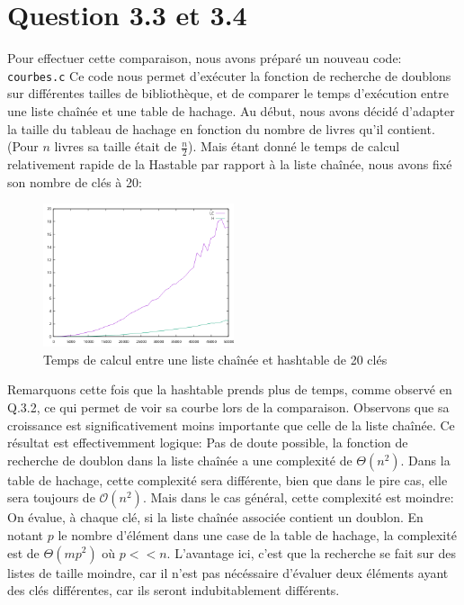 \documentclass{article}
\begin{document}
    \newpage
    \section{Question 3.3 et 3.4}
    
    Pour effectuer cette comparaison, nous avons préparé un nouveau code: 
    \texttt{courbes.c}
    \newline
    Ce code nous permet d'exécuter la fonction de recherche de doublons sur 
    différentes tailles de bibliothèque, et de comparer le temps d'exécution
    entre une liste chaînée et une table de hachage.
    \newline
    Au début, nous avons décidé d'adapter la taille du tableau de hachage en
    fonction du nombre de livres qu'il contient. (Pour $n$ livres sa taille
    était de $\frac{n}{2}$). 
    \newline
    Mais étant donné le temps de calcul relativement rapide de la Hastable
    par rapport à la liste chaînée, nous avons fixé son nombre de clés à 20:
    \begin{figure}[h]
        \centering
        \includegraphics[width=0.5\textwidth]{graph.png}
        \caption{Temps de calcul entre une liste chaînée et hashtable de 20 clés}
        \label{fig:hash20}
    \end{figure}
    \newline
    Remarquons cette fois que la hashtable prends plus de temps, comme observé
    en Q.3.2, ce qui permet de voir sa courbe lors de la comparaison.
    \newline
    Observons que sa croissance est significativement moins importante que
    celle de la liste chaînée.
    \newline
    Ce résultat est effectivemment logique: Pas de doute possible, la fonction
    de recherche de doublon dans la liste chaînée a une complexité de
    $\Theta(n^2)$. 
    \newline
    Dans la table de hachage, cette complexité sera différente, bien 
    que dans le pire cas, elle sera toujours  de $\mathcal O(n^2)$.
    \newline
    Mais dans le cas général, cette complexité est moindre:
    On évalue, à chaque clé, si la liste chaînée associée contient un doublon.
    En notant $p$ le nombre d'élément dans une case de la table de hachage,
    la complexité est de $\Theta(mp^2)$ où $p << n$.
    \newline
    L'avantage ici, c'est que la recherche se fait sur des listes de taille
    moindre, car il n'est pas nécéssaire d'évaluer deux éléments ayant des clés
    différentes, car ils seront indubitablement différents.


        
\end{document}
